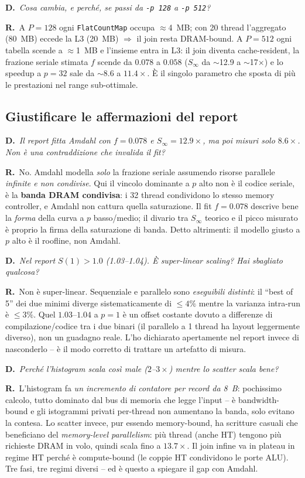 \documentclass[11pt,a4paper]{article}
\newcommand{\D}[1]{\begin{dom}\small\textbf{D.}\ \itshape #1\end{dom}}
\newcommand{\R}{\noindent\textbf{R.}\ }
\begin{document}
\D{Cosa cambia, e perché, se passi da \texttt{-p 128} a \texttt{-p 512}?}
\R A $P=128$ ogni \texttt{FlatCountMap} occupa $\approx$4~MB; con 20 thread l'aggregato (80~MB) eccede la L3 (20~MB) $\Rightarrow$ il join resta DRAM-bound. A $P=512$ ogni tabella scende a $\approx$1~MB e l'insieme entra in L3: il join diventa cache-resident, la frazione seriale stimata $f$ scende da $0.078$ a $0.058$ ($S_\infty$ da $\sim$12.9 a $\sim$17$\times$) e lo speedup a $p=32$ sale da $\sim$8.6 a $11.4\times$. È il singolo parametro che sposta di più le prestazioni nel range sub-ottimale.

\subsection{Giustificare le affermazioni del report}

\D{Il report fitta Amdahl con $f=0.078$ e $S_\infty=12.9\times$, ma poi misuri solo $8.6\times$. Non è una contraddizione che invalida il fit?}
\R No. Amdahl modella \emph{solo} la frazione seriale assumendo risorse parallele \emph{infinite e non condivise}. Qui il vincolo dominante a $p$ alto non è il codice seriale, è la \textbf{banda DRAM condivisa}: i 32 thread condividono lo stesso memory controller, e Amdahl non cattura quella saturazione. Il fit $f=0.078$ descrive bene la \emph{forma} della curva a $p$ basso/medio; il divario tra $S_\infty$ teorico e il picco misurato è proprio la firma della saturazione di banda. Detto altrimenti: il modello giusto a $p$ alto è il roofline, non Amdahl.

\D{Nel report $S(1)>1.0$ (1.03--1.04). È super-linear scaling? Hai sbagliato qualcosa?}
\R Non è super-linear. Sequenziale e parallelo sono \emph{eseguibili distinti}: il ``best of 5'' dei due minimi diverge sistematicamente di $\le 4\%$ mentre la varianza intra-run è $\le 3\%$. Quel $1.03$--$1.04$ a $p=1$ è un offset costante dovuto a differenze di compilazione/codice tra i due binari (il parallelo a 1 thread ha layout leggermente diverso), non un guadagno reale. L'ho dichiarato apertamente nel report invece di nasconderlo -- è il modo corretto di trattare un artefatto di misura.

\D{Perché l'histogram scala così male ($2$--$3\times$) mentre lo scatter scala bene?}
\R L'histogram fa \emph{un incremento di contatore per record da 8~B}: pochissimo calcolo, tutto dominato dal bus di memoria che legge l'input -- è bandwidth-bound e gli istogrammi privati per-thread non aumentano la banda, solo evitano la contesa. Lo scatter invece, pur essendo memory-bound, ha scritture casuali che beneficiano del \emph{memory-level parallelism}: più thread (anche HT) tengono più richieste DRAM in volo, quindi scala fino a $13.7\times$. Il join infine va in plateau in regime HT perché è compute-bound (le coppie HT condividono le porte ALU). Tre fasi, tre regimi diversi -- ed è questo a spiegare il gap con Amdahl.
\end{document}
